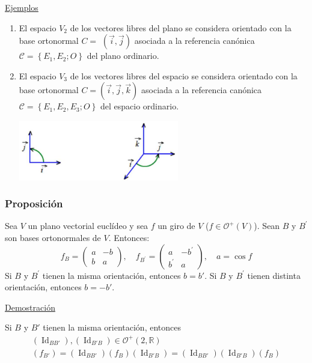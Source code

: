 \documentclass[12pt, a4paper, ones, notitlepage, openany,titlepage]{article}
\begin{document}
\noindent\underline{Ejemplos}
\begin{enumerate}[label=(\arabic*)]
	\item El espacio $V_{2}$ de los vectores libres del plano se considera orientado con la base ortonormal $C=$ $(\vec{i}, \vec{j})$ asociada a la referencia canónica $\mathcal{C}=\left\{E_{1}, E_{2} ; O\right\}$ del plano ordinario.
	
	\item El espacio $V_{3}$ de los vectores libres del espacio se considera orientado con la base ortonormal $C=(\vec{i}, \vec{j}, \vec{k})$ asociada a la referencia canónica $\mathcal{C}=\left\{E_{1}, E_{2}, E_{3} ; O\right\}$ del espacio ordinario.
	
	\includegraphics[max width=7cm, center]{2023_03_20_c2fe6c117849a1a0e8afg-057}
\end{enumerate}

\subsubsection{Proposición}
Sea $V$ un plano vectorial euclídeo y sea $f$ un giro de $V$ ($f \in \mathcal{O}^+(V)$). Sean $B$ y $B^{\prime}$ son bases ortonormales de $V$. Entonces:
$$
f_{B}=\left(\begin{array}{rr}
	a & -b \\
	b & a
\end{array}\right), \quad f_{B^{\prime}}=\left(\begin{array}{rr}
	a & -b^{\prime} \\
	b^{\prime} & a
\end{array}\right), \quad a = \operatorname{cos}f
$$
Si $B$ y $B^{\prime}$ tienen la misma orientación, entonces $b = b'$. Si $B$ y $B^{\prime}$ tienen distinta orientación, entonces $b = -b'$.

\noindent\underline{Demostración}

Si $B$ y $B'$ tienen la misma orientación, entonces
\begin{gather*}
	(\operatorname{Id}_{BB'}),(\operatorname{Id}_{B'B}) \in \mathcal{O}^+(2,\mathbb{R}) \\
	(f_{B'}) = (\operatorname{Id}_{BB'})(f_{B})(\operatorname{Id}_{B'B})
	= (\operatorname{Id}_{BB'})(\operatorname{Id}_{B'B})(f_B)
\end{gather*}
\end{document}
